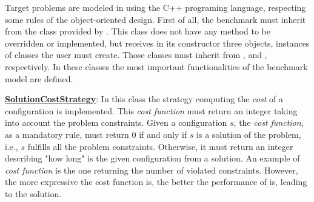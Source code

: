
Target problems are modeled in \posl{} using the C++ programing language, respecting some rules of the object-oriented design. First of all, the benchmark must inherit from the  class provided by \posl. This class does not have any method to be overridden or implemented, but receives in its constructor three objects, instances of classes the user must create. Those classes must inherit from ,  and , respectively. In these classes the most important functionalities of the benchmark model are defined.

\underline{\textbf{SolutionCostStrategy}}: In this class the strategy computing the \textit{cost} of a configuration is implemented. This \textit{cost function} must return an integer taking into account the problem constraints. Given a configuration $s$, the \textit{cost function}, as a mandatory rule, must return 0 if and only if $s$ is a solution of the problem, i.e., $s$ fulfills all the problem constraints. Otherwise, it must return an integer describing "how long" is the given configuration from a solution. An example of \textit{cost function} is the one returning the number of violated constraints. However, the more expressive the cost function is, the better the performance of \posl{} is, leading to the solution.

